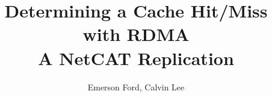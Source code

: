 \documentclass{beamer}
\title{Determining a Cache Hit/Miss with RDMA \\
A NetCAT Replication}
\author{Emerson Ford, Calvin Lee}
\date{}
\begin{document}
\frame{\titlepage}

\begin{frame}
\end{frame}
\end{document}
